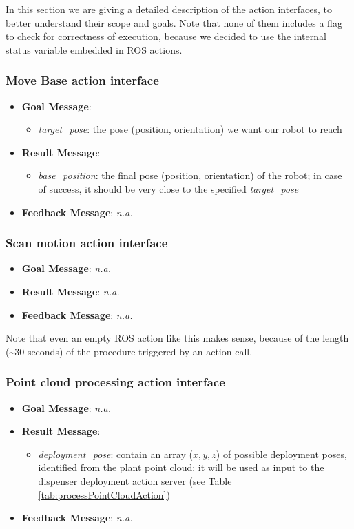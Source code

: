 In this section we are giving a detailed description of the action interfaces, to better understand their scope and goals. Note that none of them includes a flag to check for correctness of execution, because we decided to use the internal status variable embedded in \ac{ROS} actions.

\subsubsection{Move Base action interface}
\begin{itemize}
	\item \textbf{Goal Message}:
		\begin{itemize}
			\item \textit{target\_pose}: the pose (position, orientation) we want our robot to reach
		\end{itemize} 
	\item  \textbf{Result Message}:
		\begin{itemize}
			\item \textit{base\_position}: the final pose (position, orientation) of the robot; in case of success, it should be very close to the specified \textit{target\_pose}
		\end{itemize} 
	\item  \textbf{Feedback Message}: \textit{n.a.}
\end{itemize}

\subsubsection{Scan motion action interface}
\begin{itemize}
	\item \textbf{Goal Message}: \textit{n.a.}
	\item  \textbf{Result Message}: \textit{n.a.}
	\item  \textbf{Feedback Message}: \textit{n.a.}
\end{itemize}
Note that even an empty \ac{ROS} action like this makes sense, because of the length (\textasciitilde30 seconds) of the procedure triggered by an action call.

\subsubsection{Point cloud processing action interface}
\begin{itemize}
	\item \textbf{Goal Message}: \textit{n.a.}
	\item  \textbf{Result Message}: 
		\begin{itemize}
			\item \textit{deployment\_pose}: contain an array ($x,y,z$) of possible deployment poses, identified from the plant point cloud; it will be used as input to the dispenser deployment action server (see Table \ref{tab:processPointCloudAction})
		\end{itemize}
	\item  \textbf{Feedback Message}: \textit{n.a.}
\end{itemize}

